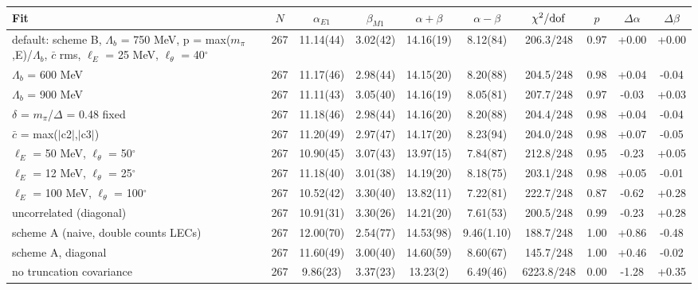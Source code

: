 \begin{tabular}{lccccccccc}
\hline
Fit & $N$ & $\alpha_{E1}$ & $\beta_{M1}$ & $\alpha+\beta$ & $\alpha-\beta$ & $\chi^2/{\rm dof}$ & $p$ & $\Delta\alpha$ & $\Delta\beta$ \\
\hline
default: scheme B, $\Lambda_b$ = 750 MeV, p = max($m_\pi$,E)/$\Lambda_b$, $\bar c$ rms, $\ell_E$ = 25 MeV, $\ell_\theta$ = 40$^\circ$ & 267 & 11.14(44) & 3.02(42) & 14.16(19) & 8.12(84) & 206.3/248 & 0.97 & +0.00 & +0.00 \\
$\Lambda_b$ = 600 MeV & 267 & 11.17(46) & 2.98(44) & 14.15(20) & 8.20(88) & 204.5/248 & 0.98 & +0.04 & -0.04 \\
$\Lambda_b$ = 900 MeV & 267 & 11.11(43) & 3.05(40) & 14.16(19) & 8.05(81) & 207.7/248 & 0.97 & -0.03 & +0.03 \\
$\delta$ = $m_\pi$/$\Delta$ = 0.48 fixed & 267 & 11.18(46) & 2.98(44) & 14.16(20) & 8.20(88) & 204.4/248 & 0.98 & +0.04 & -0.04 \\
$\bar c$ = max($|$c2$|$,$|$c3$|$) & 267 & 11.20(49) & 2.97(47) & 14.17(20) & 8.23(94) & 204.0/248 & 0.98 & +0.07 & -0.05 \\
$\ell_E$ = 50 MeV, $\ell_\theta$ = 50$^\circ$ & 267 & 10.90(45) & 3.07(43) & 13.97(15) & 7.84(87) & 212.8/248 & 0.95 & -0.23 & +0.05 \\
$\ell_E$ = 12 MeV, $\ell_\theta$ = 25$^\circ$ & 267 & 11.18(40) & 3.01(38) & 14.19(20) & 8.18(75) & 203.1/248 & 0.98 & +0.05 & -0.01 \\
$\ell_E$ = 100 MeV, $\ell_\theta$ = 100$^\circ$ & 267 & 10.52(42) & 3.30(40) & 13.82(11) & 7.22(81) & 222.7/248 & 0.87 & -0.62 & +0.28 \\
uncorrelated (diagonal) & 267 & 10.91(31) & 3.30(26) & 14.21(20) & 7.61(53) & 200.5/248 & 0.99 & -0.23 & +0.28 \\
scheme A (naive, double counts LECs) & 267 & 12.00(70) & 2.54(77) & 14.53(98) & 9.46(1.10) & 188.7/248 & 1.00 & +0.86 & -0.48 \\
scheme A, diagonal & 267 & 11.60(49) & 3.00(40) & 14.60(59) & 8.60(67) & 145.7/248 & 1.00 & +0.46 & -0.02 \\
no truncation covariance & 267 & 9.86(23) & 3.37(23) & 13.23(2) & 6.49(46) & 6223.8/248 & 0.00 & -1.28 & +0.35 \\
\hline
\end{tabular}

